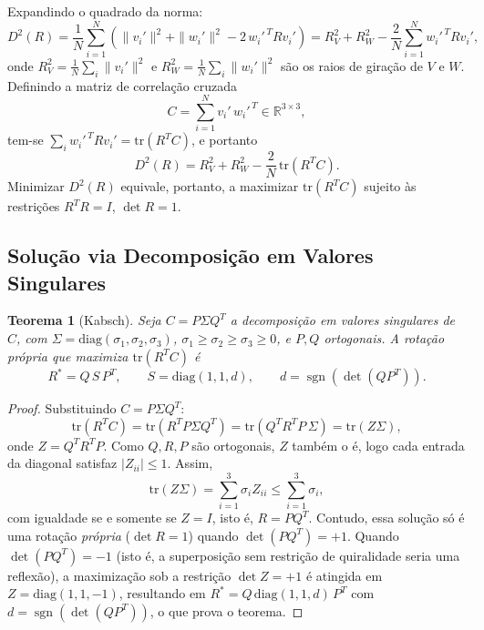 \documentclass[12pt, a4paper]{article}
\DeclareMathOperator{\sgn}{sgn}
\theoremstyle{plain}
\newtheorem{theorem}{Teorema}[section]
\theoremstyle{definition}
\theoremstyle{remark}
\newcommand{\ident}{\hspace{2em}}
\begin{document}
\ident Expandindo o quadrado da norma:
\begin{equation*}
    D^2(R) = \frac{1}{N}\sum_{i=1}^N
    \left( \|v_i'\|^2 + \|w_i'\|^2 - 2\, w_i'^{\,T} R v_i' \right)
    = R_V^2 + R_W^2 - \frac{2}{N}\sum_{i=1}^N w_i'^{\,T} R v_i',
\end{equation*}
onde $R_V^2 = \frac{1}{N}\sum_i\|v_i'\|^2$ e $R_W^2 = \frac{1}{N}\sum_i\|w_i'\|^2$ são os raios de giração de $V$ e $W$. Definindo a matriz de correlação cruzada
\begin{equation*}
    C = \sum_{i=1}^N v_i' \, w_i'^{\,T} \in \mathbb{R}^{3\times 3},
\end{equation*}
tem-se $\sum_i w_i'^{\,T} R v_i' = \mathrm{tr}(R^T C)$, e portanto
\begin{equation}
    D^2(R) = R_V^2 + R_W^2 - \frac{2}{N}\,\mathrm{tr}(R^T C).
    \label{apx:eq_reduzida}
\end{equation}
\ident Minimizar $D^2(R)$ equivale, portanto, a maximizar $\mathrm{tr}(R^T C)$ sujeito às restrições $R^TR=I$, $\det R = 1$.

\subsection{Solução via Decomposição em Valores Singulares}

\begin{theorem}[Kabsch]
    Seja $C = P\Sigma Q^T$ a decomposição em valores singulares de $C$, com
    $\Sigma=\mathrm{diag}(\sigma_1,\sigma_2,\sigma_3)$, $\sigma_1\ge\sigma_2\ge\sigma_3\ge0$,
    e $P,Q$ ortogonais. A rotação própria que maximiza $\mathrm{tr}(R^TC)$ é
    \begin{equation*}
        R^* = Q\,S\,P^T, \qquad
        S = \mathrm{diag}(1,1,d), \qquad
        d = \sgn \!\left(\det(QP^T)\right).
    \end{equation*}
\end{theorem}

\begin{proof}
Substituindo $C=P\Sigma Q^T$:
\begin{equation*}
    \mathrm{tr}(R^TC) = \mathrm{tr}(R^TP\Sigma Q^T)
    = \mathrm{tr}(Q^TR^TP\,\Sigma) = \mathrm{tr}(Z\Sigma),
\end{equation*}
onde $Z = Q^TR^TP$. Como $Q,R,P$ são ortogonais, $Z$ também o é, logo cada
entrada da diagonal satisfaz $|Z_{ii}|\le 1$. Assim,
\begin{equation*}
    \mathrm{tr}(Z\Sigma) = \sum_{i=1}^{3}\sigma_i Z_{ii} \le \sum_{i=1}^3 \sigma_i,
\end{equation*}
com igualdade se e somente se $Z=I$, isto é, $R = PQ^T$. Contudo, essa
solução só é uma rotação \emph{própria} ($\det R=1$) quando
$\det(PQ^T)=+1$. Quando $\det(PQ^T)=-1$ (isto é, a superposição sem
restrição de quiralidade seria uma reflexão), a maximização sob a restrição
$\det Z = +1$ é atingida em $Z=\mathrm{diag}(1,1,-1)$, resultando em
$R^*=Q\,\mathrm{diag}(1,1,d)\,P^T$ com $d=\sgn (\det(QP^T))$, o que
prova o teorema.
\end{proof}
\end{document}
